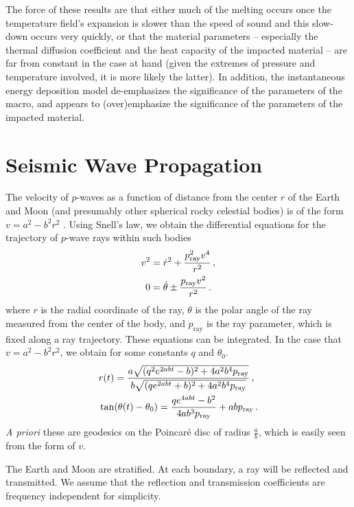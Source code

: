 \documentclass[prd,reprint,10pt]{revtex4-1}
\newcommand*\te[1]{\text{#1}}
\newcommand*\f[2]{\frac{#1}{#2}}
\begin{document}
The force of these results are that either much of the melting occurs once the temperature field's expansion is slower than the speed of sound and this slow-down occurs very quickly, or that the material parameters -- especially the thermal diffusion coefficient and the heat capacity of the impacted material -- are far from constant in the case at hand (given the extremes of pressure and temperature involved, it is more likely the latter).  In addition, the instantaneous energy deposition model de-emphasizes the significance of the parameters of the macro, and appears to (over)emphasize the significance of the parameters of the impacted material. 


\section{Seismic Wave Propagation}
The velocity of $p$-waves as a function of distance from the center $r$ of the Earth and Moon (and presumably other spherical rocky celestial bodies) is of the form $v = a^2 - b^2 r^2$ \cite{garcia2011very}\cite{dziewonski1981preliminary}. Using Snell's law, we obtain the differential equations for the trajectory of $p$-wave rays within such bodies
\begin{align}
v^2 \notag&= \dot r^2 + \f{p_\te{ray}^2 v^4}{r^2}\,,\\
0 &=\dot\theta\pm\f{p_\te{ray} v^2}{r^2}\,.
\end{align}
where $r$ is the radial coordinate of the ray, $\theta$ is the polar angle of the ray measured from the center of the body, and $p_\te{ray}$ is the ray parameter, which is fixed along a ray trajectory. These equations can be integrated. In the case that $v = a^2 - b^2 r^2$, we obtain for some constants $q$ and $\theta_0$.
\begin{align}
\notag&r(t) = \f{a\sqrt{(q^2e^{2abt}-b)^2 + 4a^2b^4 p_\te{ray}}}{b\sqrt{(qe^{2abt}+b)^2 + 4a^2b^4 p_\te{ray}}}\,,\\
&\tan(\theta(t) - \theta_0) = \f{qe^{4abt}-b^2}{4ab^3p_\te{ray}}+abp_\te{ray}\,.
\end{align}
\textit{A priori} these are geodesics on the Poincar\'e disc of radius $\f ab$, which is easily seen from the form of $v$.

The Earth and Moon are stratified. At each boundary, a ray will be reflected and transmitted. We assume that the reflection and transmission coefficients are frequency independent for simplicity. 
\end{document}
